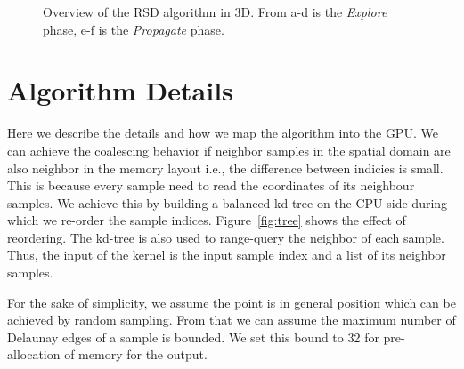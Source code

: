 \documentclass[12pt] {article}
\begin{document}
\begin{figure}[!tbh]
\centering        
   \caption{Overview of the RSD algorithm in 3D. From a-d is the \emph{Explore} phase, e-f is the \emph{Propagate} phase.}
   \label{fig:algo}
\end{figure}

\section*{Algorithm Details}
Here we describe the details and how we map the algorithm into the GPU. 
We can achieve the coalescing behavior if neighbor samples in the spatial domain are also neighbor in the memory layout i.e., the difference between indicies is small. This is because every sample need to read the coordinates of its neighbour samples. We achieve this by building a balanced kd-tree on the CPU side during which we re-order the sample indices. Figure~\ref{fig:tree} shows the effect of reordering. The kd-tree is also used to range-query the neighbor of each sample. Thus, the input of the kernel is the input sample index and a list of its neighbor samples. 

For the sake of simplicity, we assume the point is in general position which can be achieved by random sampling. From that we can assume the maximum number of Delaunay edges of a sample is bounded. We set this bound to 32 for pre-allocation of memory for the output. 
\end{document}
